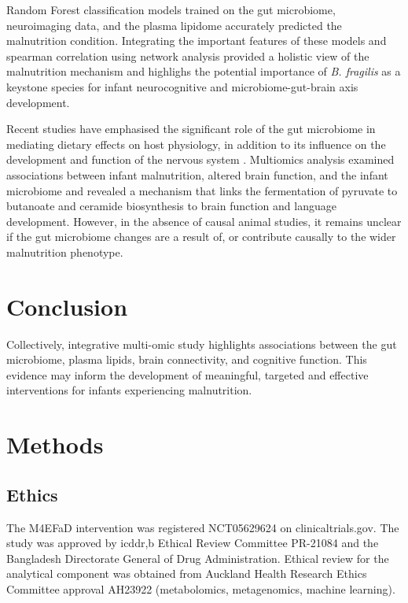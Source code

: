\documentclass{article}
\begin{document}
Random Forest classification models trained on the gut microbiome, neuroimaging data, and the plasma lipidome accurately predicted the malnutrition condition.
Integrating the important features of these models and spearman correlation using network analysis provided a holistic view of the malnutrition mechanism and highlighs the potential importance of \textit{B. fragilis} as a keystone species for infant neurocognitive and microbiome-gut-brain axis development.


Recent studies have emphasised the significant role of the gut microbiome in mediating dietary effects on host physiology, in addition to its influence on the development and function of the nervous system \cite{heiss2019role, ceppa2019current, marques2014gut, fung2017interactions}.
Multiomics analysis examined associations between infant malnutrition, altered brain function, and the infant microbiome and revealed a mechanism that links the fermentation of pyruvate to butanoate and ceramide biosynthesis to brain function and language development.
However, in the absence of causal animal studies, it remains unclear if the gut microbiome changes are a result of, or contribute causally to the wider malnutrition phenotype. 

\section*{Conclusion}
Collectively, integrative multi-omic study highlights associations between the gut microbiome, plasma lipids, brain connectivity, and cognitive function.
This evidence may inform the development of meaningful, targeted and effective interventions for infants experiencing malnutrition.

\section*{Methods}
\subsection*{Ethics}
The M4EFaD intervention was registered NCT05629624 on clinicaltrials.gov.
The study was approved by icddr,b Ethical Review Committee PR-21084 and the Bangladesh Directorate General of Drug Administration.
Ethical review for the analytical component was obtained from Auckland Health Research Ethics Committee approval AH23922 (metabolomics, metagenomics, machine learning).
\end{document}
